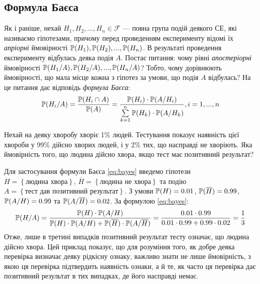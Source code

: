 \subsection{Формула Баєса}
Як і раніше, нехай $H_1, H_2, ..., H_n \in \mathcal{F}$ --- повна група подій деякого СЕ, які називаємо гіпотезами, причому
перед проведенням експерименту відомі їх \emph{апріорні} ймовірності $\P(H_1), \P(H_2), ..., \P(H_n)$.
В результаті проведення експерименту відбулась деяка подія $A$.
Постає питання: чому рівні \emph{апостеріорні} ймовірності $\P(H_1/A), \P(H_2/A), ..., \P(H_n/A)$?
Тобто, чому дорівнюють ймовірності, що мала місце кожна з гіпотез за умови, що подія $A$ відбулась? На це питання дає відповідь \emph{формула Баєса}:
\begin{equation}\label{eq:bayes}
    \P(H_i/A) = \frac{\P(H_i \cap A)}{\P(A)} = \frac{\P(H_i) \cdot \P(A/H_i)}{\sum\limits_{k=1}^n \P(H_k)\cdot \P(A/H_k)}, i = 1,...,n
\end{equation}
\begin{example}
    Нехай на деяку хворобу хворіє 1\% людей. Тестування показує наявність цієї хвороби у 99\% дійсно хворих людей,
    і у 2\% тих, що насправді не хворіють. Яка ймовірність того, що людина дійсно хвора, якщо тест має позитивний результат?
    
    Для застосування формули Баєса \eqref{eq:bayes} введемо гіпотези $H = \left\{\text{людина хвора}\right\}$, $\overline{H} = \left\{\text{людина не хвора}\right\}$ та
    подію $A = \left\{\text{тест дав позитивний результат}\right\}$.
    З умови $\P(H) = 0.01$, $\P(\overline{H}) = 0.99$, $\P(A / H) = 0.99$ та $\P(A / \overline{H}) = 0.02$.
    За формулою \eqref{eq:bayes}:
    $$\P(H / A) = \frac{
        \P(H) \cdot \P(A / H)
    }{
        \P(H) \cdot \P(A / H) + \P(\overline{H}) \cdot \P(A / \overline{H})
    } = \frac{
        0.01 \cdot 0.99
    }{
        0.01 \cdot 0.99 + 0.99 \cdot 0.02
    } = \frac{1}{3}
    $$ 
    Отже, лише в третині випадків позитивний результат тесту означає, що людина дійсно хвора. Цей приклад показує,
    що для розуміння того, як добре деяка перевірка визначає деяку рідкісну ознаку, важливо знати не лише 
    ймовірність, з якою ця перевірка підтвердить наявність ознаки, а й те, як часто ця перевірка дає позитивний результат в тих випадках,
    де його насправді немає.
\end{example}
